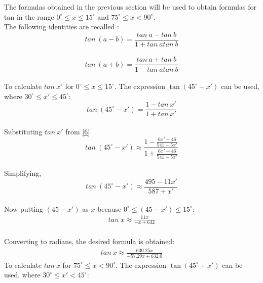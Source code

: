 \documentclass[12pt,twoside, letterpaper, margin=1in]{article}
\begin{document}
The formulas obtained in the previous section will be used to obtain formulas for tan in the range $0^\circ \leq x \leq 15^\circ$ and $75^\circ \leq x < 90^\circ$.\\
The following identities are recalled : \\
$$tan~(a-b)=\frac{tan~a-tan~b}{1+tan~atan~b}$$
\\
$$tan~(a+b)=\frac{tan~a+tan~b}{1-tan~atan~b}$$
\\
To calculate $tan~x^\circ$ for $0^\circ \leq x \leq 15^\circ$. The expression \( \tan(45^\circ - x') \) can be used, where \(30^\circ \leq x' \leq 45^\circ\): \\
$$tan~(45^\circ-x')=\frac{1-tan~x'}{1+tan~x'}$$
\\
Substituting $tan~x'$ from \eqref{6}
$$tan~(45^\circ-x')\approx \frac{1-\frac{6x'+46}{541-5x'}}{1+\frac{6x'+46}{541-5x'}}$$
\\
\vspace{1.5pt}
Simplifying,
\\
\vspace{1.5pt}
$$tan~(45^\circ-x')\approx \frac{495-11x'}{587+x'}$$
\\
Now putting $(45-x')$ as $x$ because $0^\circ \leq (45-x') \leq 15^\circ$:
\\
\begin{align}
tan~x \approx \frac{11x}{-x+632} \label{9}
\end{align}
\\
Converting to radians, the desired formula is obtained: 
\\
\vspace{1.5pt}
\begin{align}
tan~x \approx \frac{630.25 x}{-57.29 x + 632.0}
\end{align}
To calculate $tan~x$ for $75^\circ \leq x < 90^\circ$. The expression \( \tan(45^\circ + x') \) can be used, where \(30^\circ \leq x' < 45^\circ\): \\
\end{document}
